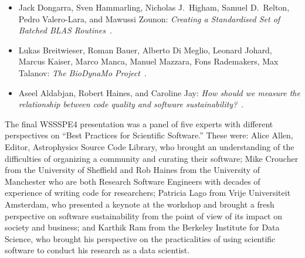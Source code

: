 \documentclass[11pt, oneside]{amsart}
\newcommand{\note}[1]{ {\textcolor{blueish}    { ***Note:      #1 }}}
\begin{document}
\begin{itemize}
    \item Jack Dongarra, Sven Hammarling, Nicholas J.\ Higham, Samuel
    D.\ Relton\textsuperscript{\textasteriskcentered}, Pedro Valero-Lara,
    and Mawussi Zounon: \textit{Creating a Standardised Set of Batched
    BLAS Routines}~\cite{Dongarra:2016ws}.

    \item Lukas Breitwieser\textsuperscript{\textasteriskcentered},
    Roman Bauer, Alberto Di Meglio, Leonard Johard,
    Marcus Kaiser, Marco Manca, Manuel Mazzara, Fons Rademakers,
    Max Talanov: \textit{The BioDynaMo Project}~\cite{Bauer:2016ws}.

    \item Aseel Aldabjan, Robert Haines, and
    Caroline Jay\textsuperscript{\textasteriskcentered}: \textit{How should we
    measure the relationship between code quality and software
    sustainability?}~\cite{Aldabjan:2016ws}.

\end{itemize}



The final WSSSPE4 presentation was a panel %
of five experts with different perspectives on ``Best Practices for Scientific Software.''
These were: Alice Allen, Editor, Astrophysics Source Code Library, who brought an understanding of the difficulties of organizing a community and curating their software;
Mike Croucher from the University of Sheffield and Rob Haines from the University of Manchester who are both Research Software Engineers with decades of experience of writing code for researchers;
Patricia Lago from Vrije Universiteit Amsterdam, who presented a keynote at the workshop  and brought a fresh perspective on software sustainability from the point of view of its impact on society and business; and
Karthik Ram from the Berkeley Institute for Data Science, who brought his perspective on the practicalities of using scientific software to conduct his research as a data scientist.

\end{document}
